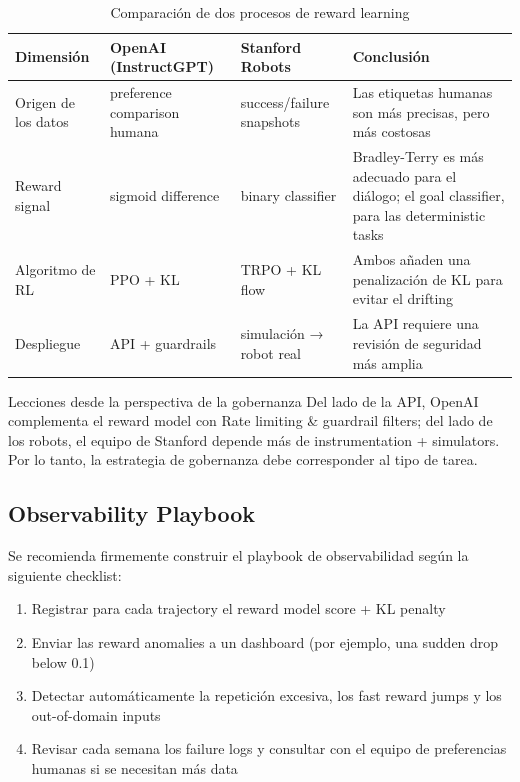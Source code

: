 \documentclass[a4paper]{article}
\begin{document}
\begin{table}[H]
\centering
\begin{tabular}{p{} p{} p{} p{}}
\toprule
Dimensión & OpenAI (InstructGPT) & Stanford Robots & Conclusión \\
\midrule
Origen de los datos & preference comparison humana & success/failure snapshots & Las etiquetas humanas son más precisas, pero más costosas \\
Reward signal & sigmoid difference & binary classifier & Bradley-Terry es más adecuado para el diálogo; el goal classifier, para las deterministic tasks \\
Algoritmo de RL & PPO + KL & TRPO + KL flow & Ambos añaden una penalización de KL para evitar el drifting \\
Despliegue & API + guardrails & simulación → robot real & La API requiere una revisión de seguridad más amplia \\
\bottomrule
\end{tabular}
\caption{Comparación de dos procesos de reward learning}
\end{table}

\begin{warningbox}{Lecciones desde la perspectiva de la gobernanza}
Del lado de la API, OpenAI complementa el reward model con Rate limiting & guardrail filters; del lado de los robots, el equipo de Stanford depende más de instrumentation + simulators. Por lo tanto, la estrategia de gobernanza debe corresponder al tipo de tarea.
\end{warningbox}

\subsection{Observability Playbook}

Se recomienda firmemente construir el playbook de observabilidad según la siguiente checklist:

\begin{enumerate}
    \item Registrar para cada trajectory el reward model score + KL penalty
    \item Enviar las reward anomalies a un dashboard (por ejemplo, una sudden drop below 0.1)
    \item Detectar automáticamente la repetición excesiva, los fast reward jumps y los out-of-domain inputs
    \item Revisar cada semana los failure logs y consultar con el equipo de preferencias humanas si se necesitan más data
\end{enumerate}
\end{document}
